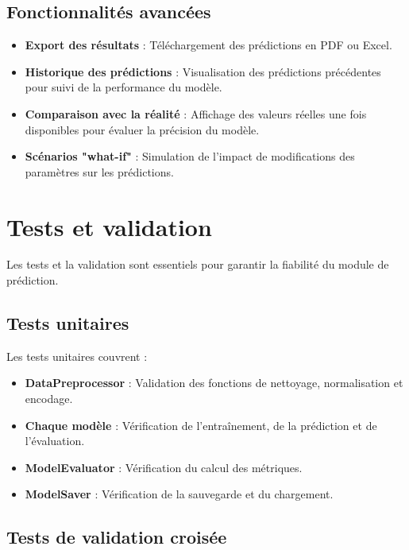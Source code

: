 \subsection{Fonctionnalités avancées}

\begin{itemize}
    \item \textbf{Export des résultats} : Téléchargement des prédictions en PDF ou Excel.
    \item \textbf{Historique des prédictions} : Visualisation des prédictions précédentes pour suivi de la performance du modèle.
    \item \textbf{Comparaison avec la réalité} : Affichage des valeurs réelles une fois disponibles pour évaluer la précision du modèle.
    \item \textbf{Scénarios "what-if"} : Simulation de l'impact de modifications des paramètres sur les prédictions.
\end{itemize}

\section{Tests et validation}
\label{sec:sprint5-tests}

Les tests et la validation sont essentiels pour garantir la fiabilité du module de prédiction.

\subsection{Tests unitaires}

Les tests unitaires couvrent :

\begin{itemize}
    \item \textbf{DataPreprocessor} : Validation des fonctions de nettoyage, normalisation et encodage.
    \item \textbf{Chaque modèle} : Vérification de l'entraînement, de la prédiction et de l'évaluation.
    \item \textbf{ModelEvaluator} : Vérification du calcul des métriques.
    \item \textbf{ModelSaver} : Vérification de la sauvegarde et du chargement.
\end{itemize}

\subsection{Tests de validation croisée}

